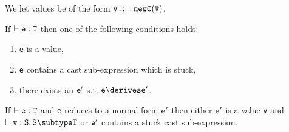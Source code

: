 We let values be of the form $\tt v ::= new C(\bar{\tt v})$. 
\begin{theorem}[Progress]
If $\vdash {\tt e:T}$ then one of the following conditions holds:
\begin{enumerate}
\item {\tt e} is a value,
\item {\tt e} contains a cast sub-expression which is stuck,
\item there exists an $\tt e'$ s.t. $\tt e\derives e'$.
\end{enumerate}
\end{theorem}

\begin{theorem}
If $\vdash {\tt e:T}$ and {\tt e} reduces to a normal form ${\tt e'}$ then
either $\tt e'$ is a value {\tt v} and $\vdash {\tt v:S},{\tt S\subtype T}$ or
${\tt e'}$ contains  a stuck cast sub-expression.
\end{theorem}




